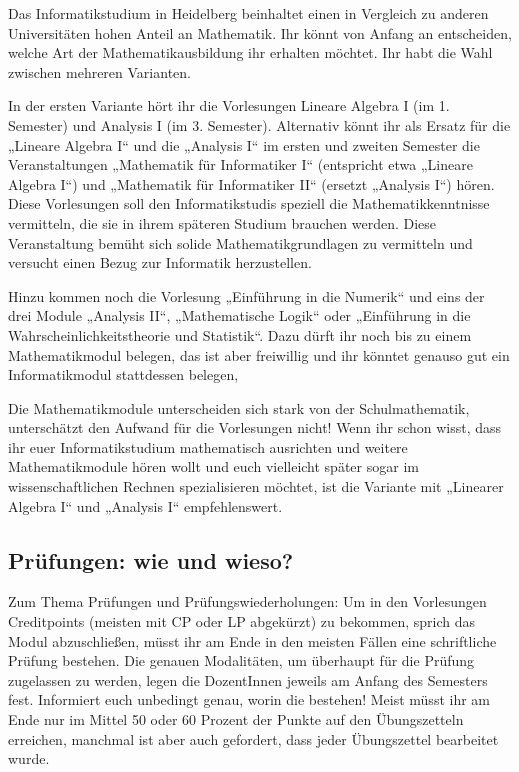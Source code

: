 Das Informatikstudium in Heidelberg beinhaltet einen in Vergleich zu anderen Universitäten hohen Anteil an Mathematik. Ihr könnt von Anfang an entscheiden, welche Art der Mathematikausbildung ihr erhalten möchtet. Ihr habt die Wahl zwischen mehreren Varianten.

In der ersten Variante hört ihr die Vorlesungen Lineare Algebra I (im 1. Semester) und Analysis I (im 3. Semester). Alternativ könnt ihr als Ersatz für die „Lineare Algebra I“ und die „Analysis I“ im ersten und zweiten Semester die Veranstaltungen „Mathematik für Informatiker I“ (entspricht etwa „Lineare Algebra I“) und „Mathematik für Informatiker II“ (ersetzt „Analysis I“) hören. Diese Vorlesungen soll den Informatikstudis speziell die Mathematikkenntnisse vermitteln, die sie in ihrem späteren Studium brauchen werden. Diese Veranstaltung bemüht sich solide Mathematikgrundlagen zu vermitteln und versucht einen Bezug zur Informatik herzustellen.

Hinzu kommen noch die Vorlesung „Einführung in die Numerik“ und eins der drei Module „Analysis II“, „Mathematische Logik“ oder „Einführung in die Wahrscheinlichkeitstheorie und Statistik“. Dazu dürft ihr noch bis zu einem Mathematikmodul belegen, das ist aber freiwillig und ihr könntet genauso gut ein Informatikmodul stattdessen belegen,

Die Mathematikmodule unterscheiden sich stark von der Schulmathematik, unterschätzt den Aufwand für die Vorlesungen nicht! Wenn ihr schon wisst, dass ihr euer Informatikstudium mathematisch ausrichten und weitere Mathematikmodule hören wollt und euch vielleicht später sogar im wissenschaftlichen Rechnen spezialisieren möchtet, ist die Variante mit „Linearer Algebra I“ und „Analysis I“ empfehlenswert.

\subsection{Prüfungen: wie und wieso?}

Zum Thema Prüfungen und Prüfungswiederholungen: Um in den Vorlesungen Creditpoints (meisten mit \gls{CP} oder \gls{LP} abgekürzt) zu bekommen, sprich das Modul abzuschließen, müsst ihr am Ende in den meisten Fällen eine schriftliche Prüfung bestehen. Die genauen Modalitäten, um überhaupt für die Prüfung zugelassen zu werden, legen die DozentInnen jeweils am Anfang des Semesters fest. Informiert euch unbedingt genau, worin die bestehen! Meist müsst ihr am Ende nur im Mittel 50 oder 60 Prozent der Punkte auf den Übungszetteln erreichen, manchmal ist aber auch gefordert, dass jeder Übungszettel bearbeitet wurde.

